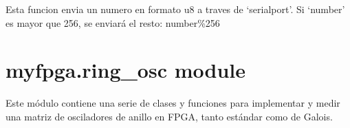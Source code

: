 \documentclass[letterpaper,10pt,english]{sphinxmanual}
\begin{document}

\begin{fulllineitems}
\label{\detokenize{myfpga:myfpga.interfaz_pcps.send_u8}}
\pysigstartsignatures
{}
\pysigstopsignatures
\sphinxAtStartPar
Esta funcion envia un numero en formato u8
a traves de ‘serialport’. Si ‘number’ es
mayor que 256, se enviará el resto: number\%256

\end{fulllineitems}



\section{myfpga.ring\_osc module}
\label{\detokenize{myfpga:module-myfpga.ring_osc}}\label{\detokenize{myfpga:myfpga-ring-osc-module}}
\sphinxAtStartPar
Este módulo contiene una serie de clases y funciones para implementar y
medir una matriz de osciladores de anillo en FPGA, tanto estándar como
de Galois.
\end{document}
